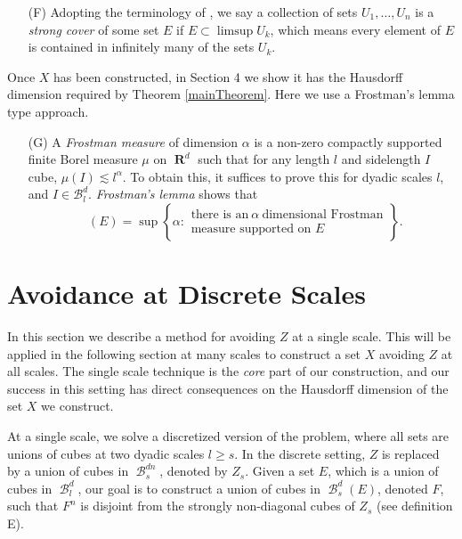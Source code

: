 \documentclass[dvipsnames,letterpaper,12pt]{article}
\theoremstyle{plain}
\DeclareMathOperator{\hausdim}{\dim_{\mathbf{H}}}
\DeclareMathOperator{\RR}{\mathbf{R}}
\DeclareMathOperator{\B}{\mathcal{B}}
\begin{document}
\begin{enumerate}
	\item[(F)] Adopting the terminology of \cite{KatzTao}, we say a collection of sets $U_1, \dots, U_n$ is a {\it strong cover} of some set $E$ if $E \subset \limsup U_k$, which means every element of $E$ is contained in infinitely many of the sets $U_k$.
\end{enumerate}

Once $X$ has been constructed, in Section 4 we show it has the Hausdorff dimension required by Theorem \ref{mainTheorem}. Here we use a Frostman's lemma type approach.

\begin{enumerate}
	\item[(G)] A {\it Frostman measure} of dimension $\alpha$ is a non-zero compactly supported finite Borel measure $\mu$ on $\RR^d$ such that for any length $l$ and sidelength $I$ cube, $\mu(I) \lesssim l^\alpha$. To obtain this, it suffices to prove this for dyadic scales $l$, and $I \in \mathcal{B}^d_l$. {\it Frostman's lemma} shows that
	\[ \hausdim(E) = \sup \left\{ \alpha: \begin{array}{c} \text{there is an}\ \alpha\ \text{dimensional Frostman}\\
	\text{measure supported on $E$} \end{array} \right\}. \]
\end{enumerate}









\section{Avoidance at Discrete Scales}\label{discretesection}


In this section we describe a method for avoiding $Z$ at a single scale. This will be applied in the following section at many scales to construct a set $X$ avoiding $Z$ at all scales. The single scale technique is the {\it core} part of our construction, and our success in this setting has direct consequences on the Hausdorff dimension of the set $X$ we construct.

At a single scale, we solve a discretized version of the problem, where all sets are unions of cubes at two dyadic scales $l \geq s$. In the discrete setting, $Z$ is replaced by a union of cubes in $\B^{dn}_s$, denoted by $Z_s$. Given a set $E$, which is a union of cubes in $\B_l^d$, our goal is to construct a union of cubes in $\B_s^d(E)$, denoted $F$, such that $F^n$ is disjoint from the strongly non-diagonal cubes of $Z_s$ (see definition E).
\end{document}
